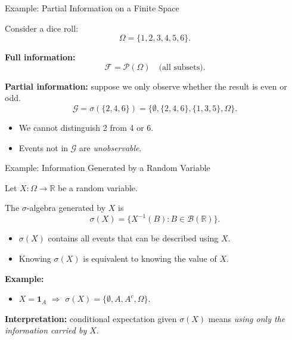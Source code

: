 \documentclass[aspectratio=169]{beamer}
\begin{document}
\begin{frame}{Example: Partial Information on a Finite Space}

Consider a dice roll:
\[
\Omega=\{1,2,3,4,5,6\}.
\]
\pause
\medskip

\textbf{Full information:}
\[
\mathcal{F}=\mathcal{P}(\Omega)
\quad\text{(all subsets)}.
\]\pause

\medskip

\textbf{Partial information:}
suppose we only observe whether the result is even or odd.
\[
\mathcal{G}
=
\sigma(\{2,4,6\})
=
\{\emptyset,\{2,4,6\},\{1,3,5\},\Omega\}.
\]
\pause
\medskip

\begin{itemize}
  \item We cannot distinguish 2 from 4 or 6.
  \item Events not in \(\mathcal{G}\) are \emph{unobservable}.
\end{itemize}

\end{frame}

\begin{frame}{Example: Information Generated by a Random Variable}

Let \(X:\Omega\to\mathbb{R}\) be a random variable.
\pause
\medskip

The \(\sigma\)-algebra generated by \(X\) is
\[
\sigma(X)
=
\{X^{-1}(B): B\in\mathcal{B}(\mathbb{R})\}.
\]\pause

\medskip

\begin{itemize}
  \item \(\sigma(X)\) contains all events that can be described using \(X\).
  \item Knowing \(\sigma(X)\) is equivalent to knowing the value of \(X\).
\end{itemize}
\pause
\medskip

\textbf{Example:}
\begin{itemize}
  \item \(X=\mathbf{1}_A\)  \(\Rightarrow\)
  \(\sigma(X)=\{\emptyset,A,A^c,\Omega\}\).
\end{itemize}
\pause
\medskip

\textbf{Interpretation:}
conditional expectation given \(\sigma(X)\) means
\emph{using only the information carried by \(X\)}.

\end{frame}


\end{document}
